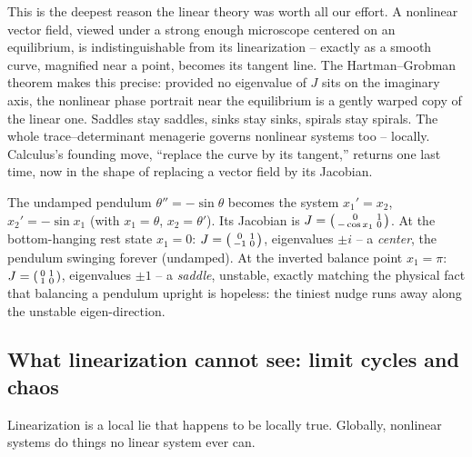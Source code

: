 \begin{whybox}
This is the deepest reason the linear theory was worth all our effort. A
nonlinear vector field, viewed under a strong enough microscope centered on an
equilibrium, is indistinguishable from its linearization -- exactly as a smooth
curve, magnified near a point, becomes its tangent line. The Hartman--Grobman
theorem makes this precise: provided no eigenvalue of $J$ sits on the imaginary
axis, the nonlinear phase portrait near the equilibrium is a gently warped copy
of the linear one. Saddles stay saddles, sinks stay sinks, spirals stay spirals.
The whole trace--determinant menagerie governs nonlinear systems too -- locally.
Calculus's founding move, ``replace the curve by its tangent,'' returns one last
time, now in the shape of replacing a vector field by its Jacobian.
\end{whybox}

\begin{example}
\label{ch39:ex-pendulum}
The undamped pendulum $\theta'' = -\sin\theta$ becomes the system $x_1' = x_2$,
$x_2' = -\sin x_1$ (with $x_1=\theta$, $x_2 = \theta'$). Its Jacobian is
$J = \begin{psmallmatrix} 0 & 1 \\ -\cos x_1 & 0\end{psmallmatrix}$. At the
bottom-hanging rest state $x_1 = 0$:
$J = \begin{psmallmatrix} 0 & 1 \\ -1 & 0\end{psmallmatrix}$, eigenvalues
$\pm i$ -- a \emph{center}, the pendulum swinging forever (undamped). At the
inverted balance point $x_1 = \pi$:
$J = \begin{psmallmatrix} 0 & 1 \\ 1 & 0\end{psmallmatrix}$, eigenvalues
$\pm 1$ -- a \emph{saddle}, unstable, exactly matching the physical fact that
balancing a pendulum upright is hopeless: the tiniest nudge runs away along the
unstable eigen-direction.
\end{example}

\subsection{What linearization cannot see: limit cycles and chaos}

Linearization is a local lie that happens to be locally true. Globally,
nonlinear systems do things no linear system ever can.

